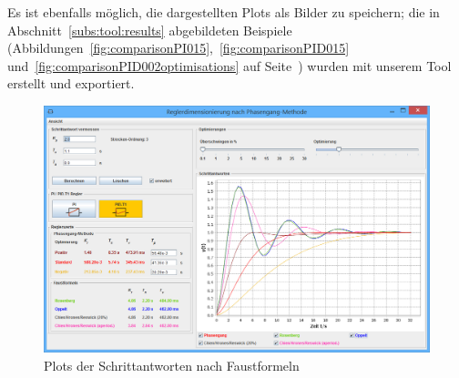 Es   ist   ebenfalls   m\"oglich,   die   dargestellten   Plots   als   Bilder
zu   speichern;   die    in   Abschnitt~\ref{subs:tool:results}   abgebildeten
Beispiele   (Abbildungen~\ref{fig:comparisonPI015},~\ref{fig:comparisonPID015}
und~\ref{fig:comparisonPID002optimisations} auf Seite~\pageref{fig:comparisonPI015})
wurden mit unserem Tool erstellt und exportiert.

\begin{figure}[h!, width=\pagewidth]
    \centering
    \includegraphics[width=\textwidth]{images/toolStartFaustFormeln.jpg}
    \caption{Plots der Schrittantworten nach Faustformeln}
    \label{fig:toolFaustFormeln}
\end{figure}

\clearpage

